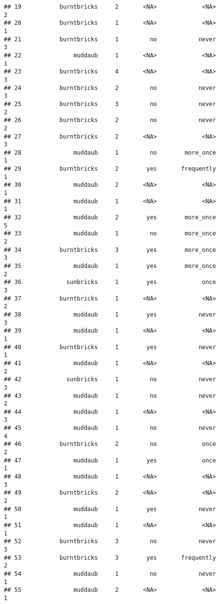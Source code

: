 \documentclass[
]{article}
\begin{document}
\begin{verbatim}
## 19           burntbricks     2       <NA>             <NA>         2
## 20           burntbricks     1       <NA>             <NA>         1
## 21           burntbricks     1         no            never         3
## 22               muddaub     1       <NA>             <NA>         1
## 23           burntbricks     4       <NA>             <NA>         3
## 24           burntbricks     2         no            never         3
## 25           burntbricks     3         no            never         2
## 26           burntbricks     2         no            never         2
## 27           burntbricks     2       <NA>             <NA>         3
## 28               muddaub     1         no        more_once         1
## 29           burntbricks     2        yes       frequently         1
## 30               muddaub     2       <NA>             <NA>         1
## 31               muddaub     1       <NA>             <NA>         1
## 32               muddaub     2        yes        more_once         5
## 33               muddaub     1         no        more_once         2
## 34           burntbricks     3        yes        more_once         3
## 35               muddaub     1        yes        more_once         2
## 36             sunbricks     1        yes             once         3
## 37           burntbricks     1       <NA>             <NA>         2
## 38               muddaub     1        yes            never         3
## 39               muddaub     1       <NA>             <NA>         1
## 40           burntbricks     1        yes            never         1
## 41               muddaub     1       <NA>             <NA>         2
## 42             sunbricks     1         no            never         3
## 43               muddaub     1         no            never         2
## 44               muddaub     1       <NA>             <NA>         3
## 45               muddaub     1         no            never         4
## 46           burntbricks     2         no             once         2
## 47               muddaub     1        yes             once         1
## 48               muddaub     1       <NA>             <NA>         3
## 49           burntbricks     2       <NA>             <NA>         2
## 50               muddaub     1        yes            never         1
## 51               muddaub     1       <NA>             <NA>         1
## 52           burntbricks     3         no            never         3
## 53           burntbricks     3        yes       frequently         2
## 54               muddaub     1         no            never         1
## 55               muddaub     2       <NA>             <NA>         1

\end{verbatim}
\end{document}
